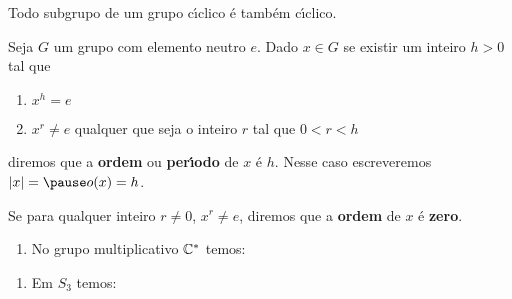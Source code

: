 \documentclass{beamer}
\begin{document}
    \begin{frame}
        \begin{proposicao}
            Todo subgrupo de um grupo c{\'\i}clico é também c{\'\i}clico.
        \end{proposicao}
    \end{frame}

    \begin{frame}
        \begin{definicao}
            Seja $G$ um grupo com elemento neutro $e$. \pause Dado $x \in G$ \pause se existir um inteiro $h > 0$ \pause tal que \pause
            \begin{enumerate}[label={\roman*})]
                \item $x^h = e$ \pause
                \item $x^r \ne e$ \pause qualquer que seja o inteiro $r$ \pause tal que $0 < r < h$\pause
            \end{enumerate}
            diremos que a \textbf{ordem} \pause ou \textbf{per{\'\i}odo} \pause de $x$ é $h$. \pause Nesse caso escreveremos $|x| = \pause o(x) = h$. \pause

            Se para qualquer inteiro \pause $r \ne 0$, \pause $x^r \ne e$, \pause diremos que a \textbf{ordem} de $x$ é \textbf{zero}.
        \end{definicao}
    \end{frame}

    \begin{frame}
        \begin{exemplos}
            \begin{enumerate}[label={\roman*})]
                \item No grupo multiplicativo $\mathbb{C}^*$ temos:
                \seti
            \end{enumerate}
        \end{exemplos}
    \end{frame}

    \begin{frame}
        \begin{exemplos}
            \begin{enumerate}[label={\roman*})]
                \conti
                \item Em $S_3$ temos:
                \seti
            \end{enumerate}
        \end{exemplos}
    \end{frame}
\end{document}
